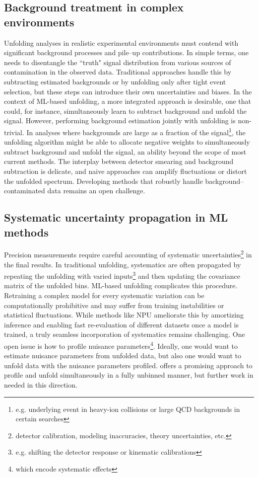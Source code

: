     \subsection{Background treatment in complex environments}
        Unfolding analyses in realistic experimental environments must contend with significant background processes and pile--up contributions.
        In simple terms, one needs to disentangle the ``truth" signal distribution from various sources of contamination in the observed data.
        Traditional approaches handle this by subtracting estimated backgrounds or by unfolding only after tight event selection, but these steps can introduce their own uncertainties and biases.
        In the context of ML-based unfolding, a more integrated approach is desirable, one that could, for instance, simultaneously learn to subtract background and unfold the signal.
        However, performing background estimation jointly with unfolding is non-trivial.
        In analyses where backgrounds are large as a fraction of the signal\footnote{e.g. underlying event in heavy-ion collisions or large QCD backgrounds in certain searches}, the unfolding algorithm might be able to allocate negative weights to simultaneously subtract background and unfold the signal, an ability beyond the scope of most current methods.
        The interplay between detector smearing and background subtraction is delicate, and naive approaches can amplify fluctuations or distort the unfolded spectrum.
        Developing methods that robustly handle background--contaminated data remains an open challenge.
    \subsection{Systematic uncertainty propagation in ML methods}
        Precision measurements require careful accounting of systematic uncertainties\footnote{detector calibration, modeling inaccuracies, theory uncertainties, etc.} in the final results.
        In traditional unfolding, systematics are often propagated by repeating the unfolding with varied inputs\footnote{e.g. shifting the detector response or kinematic calibrations} and then updating the covariance matrix of the unfolded bins.
        ML-based unfolding complicates this procedure.
        Retraining a complex model for every systematic variation can be computationally prohibitive and may suffer from training instabilities or statistical fluctuations.
        While methods like NPU ameliorate this by amortizing inference and enabling fast re-evaluation of different datasets once a model is trained, a truly seamless incorporation of systematics remains challenging.
        One open issue is how to profile nuisance parameters\footnote{which encode systematic effects}.
        Ideally, one would want to estimate nuisance parameters from unfolded data, but also one would want to unfold data with the nuisance parameters profiled.
        \cite{zhu2024multidimensional} offers a promising approach to profile and unfold simultaneously in a fully unbinned manner, but further work in needed in this direction.

